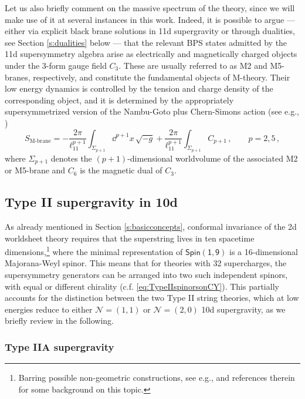 Let us also briefly comment on the massive spectrum of the theory, since we will make use of it at several instances in this work. Indeed, it is possible to argue --- either via explicit black brane solutions in 11d supergravity \cite{Gueven:1992hh} or through dualities, see Section \ref{s:dualities} below --- that the relevant BPS states admitted by the 11d supersymmetry algebra arise as electrically and magnetically charged objects under the 3-form gauge field $C_3$. These are usually referred to as M2 and M5-branes, respectively, and constitute the fundamental objects of M-theory. Their low energy dynamics is controlled by the tension and charge density of the corresponding object, and it is determined by the appropriately supersymmetrized version of the Nambu-Goto plus Chern-Simons action (see e.g., \cite{Becker:2006dvp})
%
\begin{equation}\label{eq:DBICSactionMpbranes}
				S_\text{M-brane} = -\frac{2 \pi}{\ell_{11}^{p+1}} \int_{\Sigma_{p+1}} \dd^{p+1}x\, \sqrt{- g} + \frac{2 \pi}{\ell_{11}^{p+1}} \int_{\Sigma_{p+1}}  C_{p+1}\, ,\qquad p=2, 5\, ,
\end{equation}
% 
where $\Sigma_{p+1}$ denotes the $(p+1)$-dimensional worldvolume of the associated M2 or M5-brane and $C_6$ is the magnetic dual of $C_3$.

\subsection{Type II supergravity in 10d}\label{ss:IIAB10d}

As already mentioned in Section \ref{s:basicconcepts}, conformal invariance of the 2d worldsheet theory requires that the superstring lives in ten spacetime dimensions,\footnote{Barring possible non-geometric constructions, see e.g., \cite{Gepner:1989gr,Flournoy:2004vn,Hull:2004in,Font:2017cya,Plauschinn:2018wbo} and references therein for some background on this topic.} where the minimal representation of $\mathsf{Spin(1,9)}$ is a 16-dimensional Majorana-Weyl spinor. This means that for theories with 32 supercharges, the supersymmetry generators can be arranged into two such independent spinors, with equal or different chirality (c.f. \eqref{eq:TypeIIspinorsonCY}). This partially accounts for the distinction between the two Type II string theories, which at low energies reduce to either $\mathcal{N}=(1,1)$ or $\mathcal{N}=(2,0)$ 10d supergravity, as we briefly review in the following.

\subsubsection*{Type IIA supergravity}

